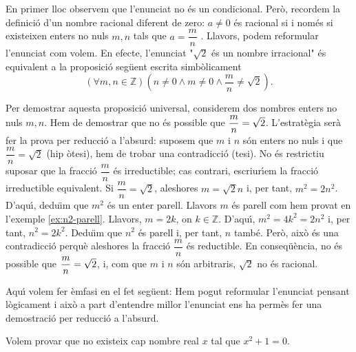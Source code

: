 \begin{solucio}
En primer lloc observem que l'enunciat no \'{e}s un condicional. Per\`{o},
recordem la definici\'{o} d'un nombre racional diferent de zero: $a\neq0$
\'{e}s racional si i nom\'{e}s si existeixen enters no nuls $m,n$ tals que $a=\dfrac{m}{n}$%
. Llavors, podem reformular l'enunciat com volem. En efecte, l'enunciat "$%
\sqrt{2}$ \'{e}s un nombre irracional" \'{e}s equivalent a la proposici\'{o}
seg\"{u}ent escrita simb\`{o}licament
\begin{equation*}
\left( \forall m,n\in\mathbb{Z}\right) \left( n\neq0\wedge m\neq 0\wedge%
\frac{m}{n}\neq\sqrt{2}\right) .
\end{equation*}

Per demostrar aquesta proposici\'{o} universal, considerem dos nombres enters
no nuls $m,n$. Hem de demostrar que no \'{e}s possible que $\dfrac{m}{n}=\sqrt {%
2}$. L'estrat\`{e}gia ser\`{a} fer la prova per reducci\'{o} a l'absurd:
suposem que $m$ i $n$ s\'{o}n enters no nuls i que $\dfrac{m}{n}=\sqrt{2}$ (hip%
\`{o}tesi), hem de trobar una contradicci\'{o} (tesi). No \'{e}s restrictiu
suposar que la fracci\'{o} $\dfrac{m}{n}$ \'{e}s irreductible; cas contrari,
escriur\'{\i}em la fracci\'{o} irreductible equivalent. Si $\dfrac{m}{n}=%
\sqrt{2}$, aleshores $m=\sqrt{2}n$ i, per tant, $m^{2}=2n^{2}$. D'aqu\'{\i},
dedu\"{\i}m que $m^{2}$ \'{e}s un enter parell. Llavors $m$ \'{e}s parell
com hem provat en l'exemple \ref{ex:n2-parell}. Llavors, $m=2k$, on $k\in\mathbb{Z}$.
D'aqu\'{\i}, $m^{2}=4k^{2}=2n^{2}$ i, per tant, $n^{2}=2k^{2}$. Dedu\"{\i}m
que $n^{2}$ \'{e}s parell i, per tant, $n$ tamb\'{e}. Per\`{o}, aix\`{o}
\'{e}s una contradicci\'{o} perqu\`{e} aleshores la fracci\'{o} $\dfrac{m}{n}
$ \'{e}s reductible. En conseq\"{u}\`{e}ncia, no \'{e}s possible que $\dfrac{%
m}{n}=\sqrt{2}$, i, com que $m$ i $n$ s\'{o}n arbitraris, $\sqrt{2}$ no \'{e}s
racional.

Aqu\'{\i} volem fer \`{e}mfasi en el fet seg\"{u}ent: Hem pogut reformular
l'enunciat pensant l\`{o}gicament i aix\`{o} a part d'entendre millor
l'enunciat ens ha perm\`{e}s fer una demostraci\'{o} per reducci\'{o} a
l'absurd.
\end{solucio}

\begin{exemple}
Volem provar que no existeix cap nombre real $x$ tal que $x^{2}+1=0$.
\end{exemple}


